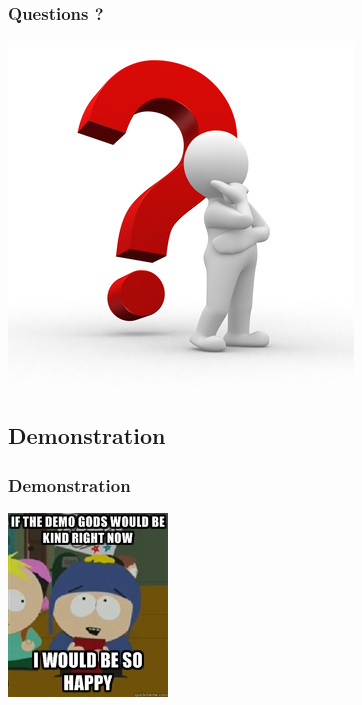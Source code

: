 \documentclass{beamer}
\begin{document}
\begin{frame}
\frametitle{Questions ?}
\begin{center}
\includegraphics[scale=0.5]{includes/questions.jpg}
\end{center}
\end{frame}


\subsection{Demonstration}

\begin{frame}
\frametitle{Demonstration}
\begin{center}
\includegraphics[scale=1.5]{includes/demogods.jpg}
\end{center}
\end{frame}
\end{document}
